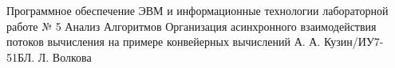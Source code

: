 \documentclass{bmstu}
\begin{document}

{Программное обеспечение ЭВМ и информационные технологии}
{лабораторной работе № 5}
{Анализ Алгоритмов}
{Организация асинхронного взаимодействия потоков вычисления на примере конвейерных вычислений}
{}{А. А. Кузин/ИУ7-51Б}{Л. Л. Волкова}


\renewcommand{\contentsname}{Содержание}
\tableofcontents
\setcounter{page}{2}






\makebibliography
\end{document}
